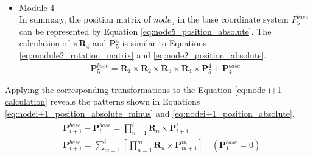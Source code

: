 \begin{itemize}
\begin{align}
    \end{align}
    \item Module 4 \\
    In summary, the position matrix of $node_5$ in the base coordinate system $P_5^{base}$can be represented by 
    Equation \ref{eq:node5_position_absolute}. The calculation of $\times\textbf{R}_{4}$ and $\textbf{P}_{5}^{4}$ 
    is similar to Equations \ref{eq:module2_rotation_matrix} and \ref{eq:node2_position_absolute}.
    \begin{align}
        \textbf{P}_{5}^{base} = \textbf{R}_{1} \times\textbf{R}_{2} \times\textbf{R}_{3} \times\textbf{R}_{4} 
        \times \textbf{P}_{5}^{4} + \textbf{P}_{4}^{base}
        \label{eq:node5_position_absolute}
    \end{align}
\end{itemize}
Applying the corresponding transformations to the Equation \ref{eq:node i+1 calculation} reveals the patterns shown 
in Equations \ref{eq:nodei+1_position_absolute_minus} and \ref{eq:nodei+1_position_absolute}.
\begin{align}
    &\textbf{P}_{i+1}^{base} - \textbf{P}_{i}^{base} = \prod_{n=1}^{i}\textbf{R}_{n}\times \textbf{P}_{i+1}^{i} 
    \label{eq:nodei+1_position_absolute_minus} \\
    &\textbf{P}_{i+1}^{base} = \sum_{m=1}^{i}\left[\prod_{n=1}^{m}\textbf{R}_{n}\times \textbf{P}_{m+1}^{m}\right] \quad(\textbf{P}_{1}^{base} = 0)
    \label{eq:nodei+1_position_absolute}
\end{align}
